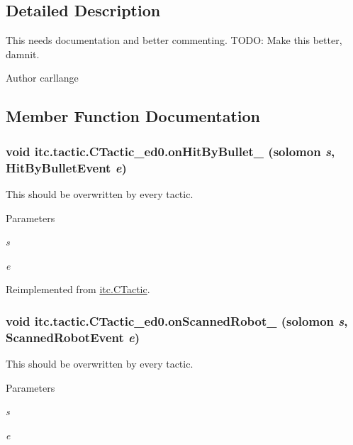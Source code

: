 \subsection{Detailed Description}
This needs documentation and better commenting. TODO: Make this better, damnit. \begin{DoxyAuthor}{Author}
carllange 
\end{DoxyAuthor}


\subsection{Member Function Documentation}
\hypertarget{classitc_1_1tactic_1_1_c_tactic__ed0_ad04cdcbec1998d1c7bee55a9dc959505}{
\subsubsection[{onHitByBullet\_\-}]{\setlength{\rightskip}{0pt plus 5cm}void itc.tactic.CTactic\_\-ed0.onHitByBullet\_\- ({\bf solomon} {\em s}, \/  HitByBulletEvent {\em e})}}
\label{classitc_1_1tactic_1_1_c_tactic__ed0_ad04cdcbec1998d1c7bee55a9dc959505}
This should be overwritten by every tactic. 
\begin{DoxyParams}{Parameters}
\item[{\em s}]\item[{\em e}]\end{DoxyParams}


Reimplemented from \hyperlink{classitc_1_1_c_tactic_a9a8d125f826667459758f2767c3bd957}{itc.CTactic}.\hypertarget{classitc_1_1tactic_1_1_c_tactic__ed0_aa1b6857853a2bc90fcf4309b39a3907a}{
\subsubsection[{onScannedRobot\_\-}]{\setlength{\rightskip}{0pt plus 5cm}void itc.tactic.CTactic\_\-ed0.onScannedRobot\_\- ({\bf solomon} {\em s}, \/  ScannedRobotEvent {\em e})}}
\label{classitc_1_1tactic_1_1_c_tactic__ed0_aa1b6857853a2bc90fcf4309b39a3907a}
This should be overwritten by every tactic. 
\begin{DoxyParams}{Parameters}
\item[{\em s}]\item[{\em e}]\end{DoxyParams}


